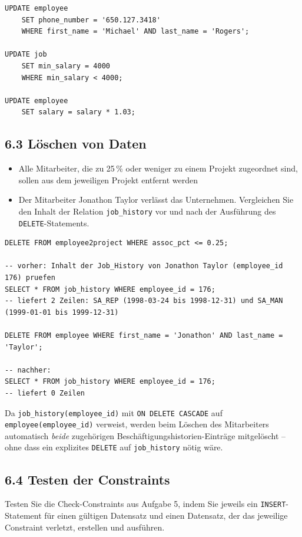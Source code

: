 \documentclass[11pt,a4paper]{article}
\begin{document}
\begin{loesung}
\begin{lstlisting}
UPDATE employee
    SET phone_number = '650.127.3418'
    WHERE first_name = 'Michael' AND last_name = 'Rogers';

UPDATE job
    SET min_salary = 4000
    WHERE min_salary < 4000;

UPDATE employee
    SET salary = salary * 1.03;
\end{lstlisting}
\end{loesung}

\subsection*{6.3 \quad L\"oschen von Daten}
\begin{itemize}
\item Alle Mitarbeiter, die zu 25\,\% oder weniger zu einem Projekt zugeordnet sind, sollen aus dem jeweiligen Projekt entfernt werden
\item Der Mitarbeiter Jonathon Taylor verl\"asst das Unternehmen. Vergleichen Sie den Inhalt der Relation \texttt{job\_history} vor und nach der Ausf\"uhrung des \texttt{DELETE}-Statements.
\end{itemize}

\begin{loesung}
\begin{lstlisting}
DELETE FROM employee2project WHERE assoc_pct <= 0.25;

-- vorher: Inhalt der Job_History von Jonathon Taylor (employee_id 176) pruefen
SELECT * FROM job_history WHERE employee_id = 176;
-- liefert 2 Zeilen: SA_REP (1998-03-24 bis 1998-12-31) und SA_MAN (1999-01-01 bis 1999-12-31)

DELETE FROM employee WHERE first_name = 'Jonathon' AND last_name = 'Taylor';

-- nachher:
SELECT * FROM job_history WHERE employee_id = 176;
-- liefert 0 Zeilen
\end{lstlisting}
Da \texttt{job\_history(employee\_id)} mit \texttt{ON DELETE CASCADE} auf \texttt{employee(employee\_id)} verweist, werden beim L\"oschen des Mitarbeiters automatisch \emph{beide} zugeh\"origen Besch\"aftigungshistorien-Eintr\"age mitgel\"oscht -- ohne dass ein explizites \texttt{DELETE} auf \texttt{job\_history} n\"otig w\"are.
\end{loesung}

\subsection*{6.4 \quad Testen der Constraints}
Testen Sie die Check-Constraints aus Aufgabe 5, indem Sie jeweils ein \texttt{INSERT}-Statement f\"ur einen g\"ultigen Datensatz und einen Datensatz, der das jeweilige Constraint verletzt, erstellen und ausf\"uhren.
\end{document}

